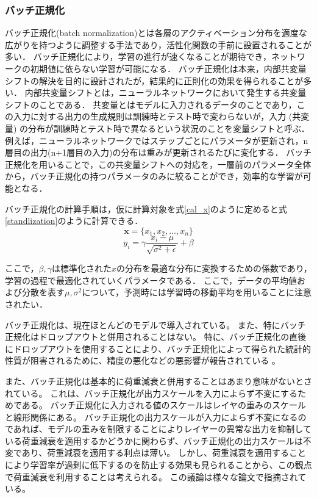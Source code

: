     \subsubsection{バッチ正規化}
    バッチ正規化\cite{ioffe2015batch}(batch normalization)とは各層のアクティベーション分布を適度な広がりを持つように調整する手法であり，活性化関数の手前に設置されることが多い．
    バッチ正規化により，学習の進行が速くなることが期待でき，ネットワークの初期値に依らない学習が可能になる．
    バッチ正規化は本来，内部共変量シフトの解決を目的に設計されたが，結果的に正則化の効果を得られることが多い．
    内部共変量シフトとは，ニューラルネットワークにおいて発生する共変量シフトのことである．
    共変量とはモデルに入力されるデータのことであり，この入力に対する出力の生成規則は訓練時とテスト時で変わらないが，入力 (共変量) の分布が訓練時とテスト時で異なるという状況のことを変量シフトと呼ぶ．
    例えば，ニューラルネットワークではステップごとにパラメータが更新され，n層目の出力(n+1層目の入力)の分布は重みが更新されるたびに変化する．
    バッチ正規化を用いることで，この共変量シフトへの対応を，一層前のパラメータ全体から，バッチ正規化の持つパラメータのみに絞ることができ，効率的な学習が可能となる．
    
    バッチ正規化の計算手順は，仮に計算対象を式\ref{cal_x}のように定めると式\ref{standlization}のように計算できる．
    \begin{equation}
        \bm{x} = \{x_1,x_2, ... ,x_n\}
        \label{cal_x}
    \end{equation}
    \begin{equation}
        y_i = \gamma \frac{x_i-\mu}{\sqrt{\sigma^2+\epsilon}} + \beta
        \label{standlization}
    \end{equation}
    
    ここで，$\beta,\gamma$は標準化された$x$の分布を最適な分布に変換するための係数であり，学習の過程で最適化されていくパラメータである．
    ここで，データの平均値および分散を表す$\mu,\sigma^2$について，予測時には学習時の移動平均を用いることに注意されたい．
    
    バッチ正規化は、現在ほとんどのモデルで導入されている。
    また、特にバッチ正規化はドロップアウトと併用されることはない。
    特に、バッチ正規化の直後にドロップアウトを使用することにより、バッチ正規化によって得られた統計的性質が阻害されるために、精度の悪化などの悪影響が報告されている\cite{li2019understanding} 。
    
    また、バッチ正規化は基本的に荷重減衰と併用することはあまり意味がないとされている。
    これは、バッチ正規化が出力スケールを入力によらず不変にするためである。
    バッチ正規化に入力される値のスケールはレイヤの重みのスケールと線形関係にある。
    バッチ正規化の出力スケールが入力によらず不変になるのであれば、モデルの重みを制限することによりレイヤーの異常な出力を抑制している荷重減衰を適用するかどうかに関わらず、バッチ正規化の出力スケールは不変であり、荷重減衰を適用する利点は薄い。
    しかし、荷重減衰を適用することにより学習率が過剰に低下するのを防止する効果も見られることから、この観点で荷重減衰を利用することは考えられる。
    この議論は様々な論文で指摘されている\cite{van2017l2, hoffer2018norm}。

